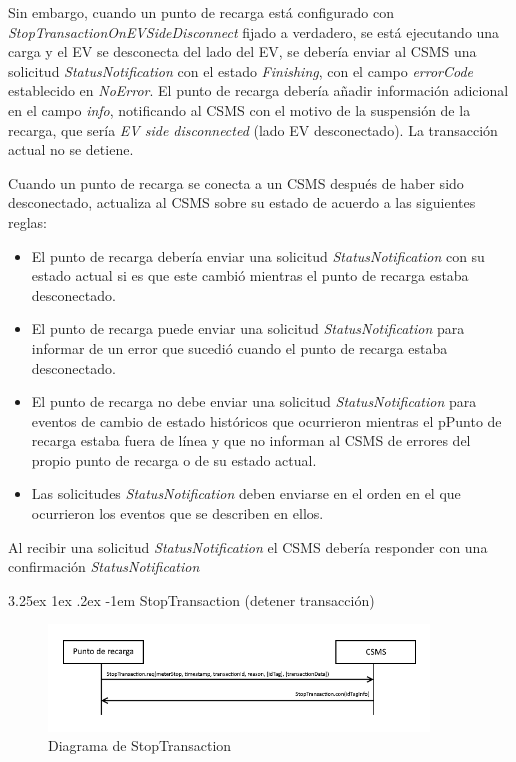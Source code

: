 \documentclass[12pt,a4paper,onecolumn,oneside]{report}
\makeatletter
\renewcommand\paragraph{\@startsection{paragraph}{5}{\z@}%
  {3.25ex \@plus1ex \@minus.2ex}%
  {-1em}%
  {\normalfont\normalsize\bfseries}}
\makeatother
\begin{document}
Sin embargo, cuando un punto de recarga está configurado con \textit{StopTransactionOnEVSideDisconnect} fijado a verdadero, se
está ejecutando una carga y el EV se desconecta del lado del EV, se debería enviar al CSMS una solicitud \textit{StatusNotification} con el estado \textit{Finishing}, con el campo \textit{errorCode} establecido en \textit{NoError}. El punto de recarga debería añadir información adicional en el campo \textit{info}, notificando al CSMS con el motivo de la suspensión de la recarga, que sería \textit{EV side disconnected} (lado EV desconectado). La transacción actual no se detiene.

Cuando un punto de recarga se conecta a un CSMS después de haber sido desconectado, actualiza al CSMS sobre su estado de acuerdo a las siguientes reglas:

\begin{itemize}
\item El punto de recarga debería enviar una solicitud \textit{StatusNotification} con su estado actual si es que este cambió mientras el punto de recarga estaba desconectado.
\item El punto de recarga puede enviar una solicitud \textit{StatusNotification} para informar de un error que sucedió cuando el punto de recarga estaba desconectado.
\item El punto de recarga no debe enviar una solicitud \textit{StatusNotification} para eventos de cambio de estado históricos que
ocurrieron mientras el pPunto de recarga estaba fuera de línea y que no informan al CSMS de errores del propio punto de recarga o de su estado actual.
\item Las solicitudes \textit{StatusNotification} deben enviarse en el orden en el que ocurrieron los eventos que se describen en ellos.

\end{itemize}

Al recibir una solicitud \textit{StatusNotification} el CSMS debería responder con una confirmación \textit{StatusNotification}

\paragraph{StopTransaction (detener transacción)}
\label{StopTransaction (detener transacción)}


\begin{figure}[H] 
\centering
  \includegraphics[width=0.9\textwidth]{figuras/diagramastoptransaction.png}
  \caption[Diagrama de \textit{StopTransaction}]{Diagrama de StopTransaction\\
  }
  \label{fig:diagramastoptransaction}
\end{figure}
\end{document}
